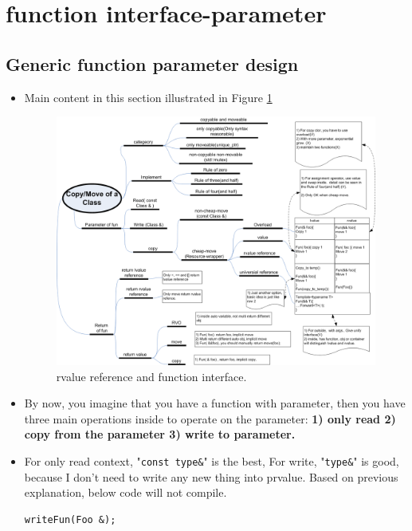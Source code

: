 \documentclass[a4paper,11pt,twoside]{book}
\begin{document}
\section{function interface-parameter}

\subsection{Generic function parameter design}
\begin{itemize}
\item Main content in this section illustrated in Figure \ref{fig:rvalueref}

	\begin{figure}[h]
	\centering
	\includegraphics[width=1.0\linewidth]{pics/move.png}
	\caption{rvalue reference and function interface.}
	\label{fig:rvalueref}
\end{figure}


\item  By now, you imagine that you have a function with parameter, then you have three main operations inside to operate on the parameter: \textbf{1) only read 2) copy from the parameter 3) write to parameter.}

\item For only read context, "\texttt{const type\&}" is the best, For write, "\texttt{type\&}" is good, because I don't need to write any new thing into prvalue. Based on previous explanation, below code will not compile. 
\begin{lstlisting}[numbers=none]
writeFun(Foo &);


\end{lstlisting}
\end{itemize}
\end{document}
